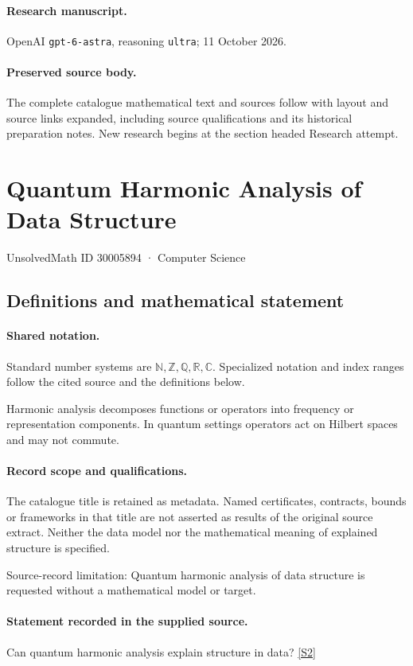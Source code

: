 \documentclass[11pt]{article}
\begin{document}
\paragraph{Research manuscript.} OpenAI \texttt{gpt-6-astra}, reasoning \texttt{ultra}; 11 October 2026.
\paragraph{Preserved source body.} The complete catalogue mathematical text and sources follow with layout and source links expanded, including source qualifications and its historical preparation notes. New research begins at the section headed Research attempt.

\section{Quantum Harmonic Analysis of Data Structure}\label{30005894}
{\small UnsolvedMath ID 30005894 · Computer Science}
\subsection{Definitions and mathematical statement}

\paragraph{Shared notation.}Standard number systems are $\mathbb N,\mathbb Z,\mathbb Q,\mathbb R,\mathbb C$. Specialized notation and index ranges follow the cited source and the definitions below.


Harmonic analysis decomposes functions or operators into frequency or representation components. In quantum settings operators act on Hilbert spaces and may not commute.
\paragraph{Record scope and qualifications.}
The catalogue title is retained as metadata. Named certificates, contracts, bounds or frameworks in that title are not asserted as results of the original source extract.
Neither the data model nor the mathematical meaning of explained structure is specified.

Source-record limitation: Quantum harmonic analysis of data structure is requested without a mathematical model or target.
\paragraph{Statement recorded in the supplied source.}
Can quantum harmonic analysis explain structure in data? \href{https://doi.org/10.4171/owr/2024/21}{[S2]}
\end{document}
